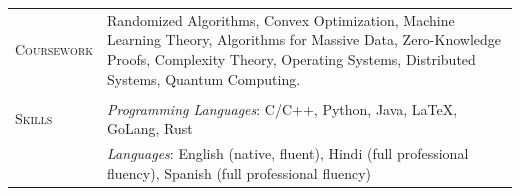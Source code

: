 \documentclass[10pt]{article}
\newlength{\lcol}\setlength{\lcol}{100pt}
\newlength{\rcol}\setlength{\rcol}{\dimexpr\textwidth-\lcol\relax}
\newcommand{\sectionhead}[1]{\textsc{#1}}
\begin{document}
\begin{longtable}{@{}p{\lcol}@{}p{\rcol}@{}}

\sectionhead{Coursework} 
& Randomized Algorithms, Convex Optimization, Machine Learning Theory, Algorithms for Massive Data, Zero-Knowledge Proofs, Complexity Theory, Operating Systems, Distributed Systems, Quantum Computing.
\\ \\



\sectionhead{Skills} 
& \textit{Programming Languages}: C/C++, Python, Java, LaTeX, GoLang, Rust \\
&\textit{Languages}: English (native, fluent), Hindi (full professional fluency), Spanish (full professional fluency)
\\

\end{longtable}
\end{document}
